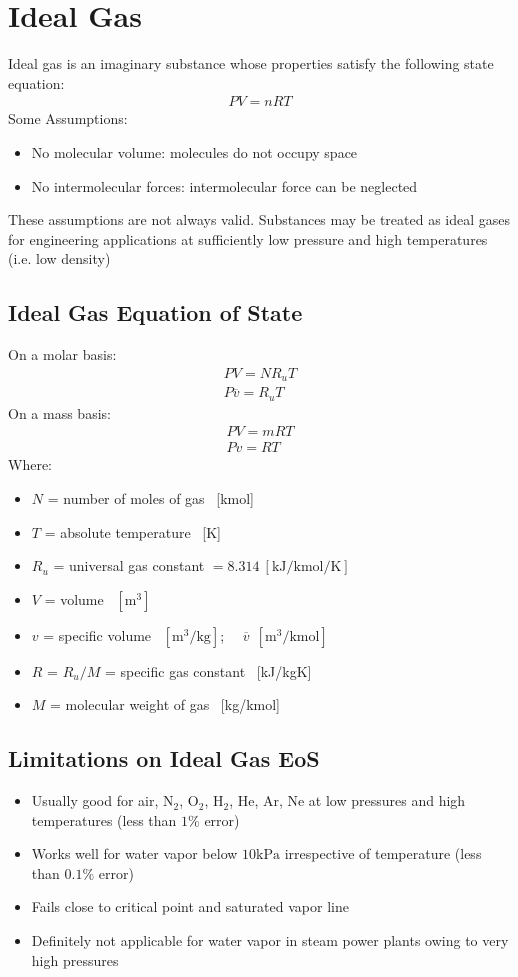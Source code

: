 \documentclass[class=report, crop=false, 12pt,a4paper]{standalone}
\numberwithin{equation}{section}
\begin{document}
\section{Ideal Gas}
Ideal gas is an imaginary substance whose properties satisfy the following state equation: 
\begin{gather}
  PV = nRT
\end{gather}
Some Assumptions:
\begin{itemize}[noitemsep]
  \item No molecular volume: molecules do not occupy space
  \item No intermolecular forces: intermolecular force can be neglected
\end{itemize}
These assumptions are not always valid. Substances may be treated as ideal gases for engineering applications at sufficiently low pressure and high temperatures (i.e. low density)
\subsection{Ideal Gas Equation of State}
On a molar basis:
\begin{gather}
  PV = NR_uT \\[5pt]
  P\overline{v} = R_uT
\end{gather}
On a mass basis:
\begin{gather}
  PV = mRT \\[5pt] 
  Pv = RT
\end{gather}
Where:
\begin{itemize}[noitemsep]
  \item $N$ = number of moles of gas \ [kmol]
  \item $T$ = absolute temperature \ [K]
  \item $R_u$ = universal gas constant $= 8.314 \ [\si{\kilo\joule\per\kilo\mole\per\kelvin}]$
  \item $V$ = volume \ $[\si{\metre\cubed}]$
  \item $v$ = specific volume \ $[\si{\metre\cubed\per\kilogram}]$; \ \ $\overline{v} \ \ [\si{\metre\cubed\per\kilo\mole}]$
  \item $R$ = $R_u/M$ = specific gas constant \ [kJ/kgK]
  \item $M$ = molecular weight of gas \ [kg/kmol]
\end{itemize}
\subsection{Limitations on Ideal Gas EoS}
\begin{itemize}
  \item Usually good for air, N$_2$, O$_2$, H$_2$, He, Ar, Ne at low pressures and high temperatures (less than $1\%$ error)
  \item Works well for water vapor below $10\si{\kilo\pascal}$ irrespective of temperature (less than $0.1\%$ error)
  \item Fails close to critical point and saturated vapor line
  \item Definitely not applicable for water vapor in steam power plants owing to very high pressures
\end{itemize}
\end{document}
